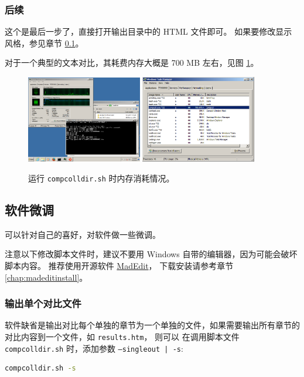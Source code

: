 \documentclass{article}
\begin{document}
\subsubsection{后续}

这个是最后一步了，直接打开输出目录中的 HTML 文件即可。
如果要修改显示风格，参见章节 \ref{chap:softsetup}。

对于一个典型的文本对比，其耗费内存大概是 700 MB 左右，见图 \ref{fig:compcollmem}。


\begin{figure}[ht]\centering
  \includegraphics[width=0.45\textwidth]{figures/run4.png}
  \includegraphics[width=0.45\textwidth]{figures/run-mem.png}
  \caption{运行 \texttt{compcolldir.sh} 时内存消耗情况。}\label{fig:compcollmem}
\end{figure}



\clearpage
\subsection{软件微调} \label{chap:softsetup}
可以针对自己的喜好，对软件做一些微调。

注意以下修改脚本文件时，建议不要用 Windows 自带的编辑器，因为可能会破坏脚本内容。
推荐使用开源软件 \href{http://code.google.com/p/madedit-pv/}{MadEdit}，
下载安装请参考章节 \ref{chap:madeditinstall}。

\subsubsection{输出单个对比文件}
软件缺省是输出对比每个单独的章节为一个单独的文件，如果需要输出所有章节的对比内容到一个文件，如 \texttt{results.htm}，
则可以
在调用脚本文件 \texttt{compcolldir.sh} 时，添加参数 \texttt{--singleout | -s}:
\begin{lstlisting}[language=bash]
compcolldir.sh -s
\end{lstlisting}
\end{document}
